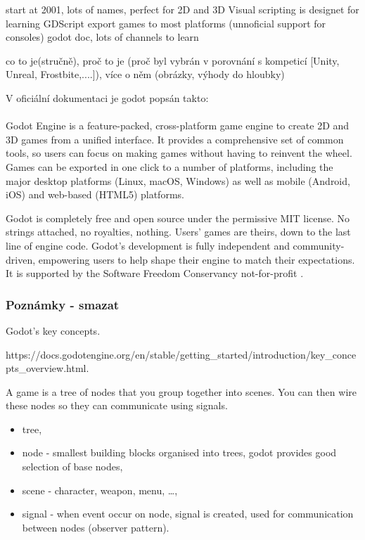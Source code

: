 start at 2001, lots of names, perfect for 2D and 3D
Visual scripting is designet for learning GDScript
export games to most platforms (unnoficial support for consoles)
godot doc, lots of channels to learn


co to je(stručně), proč to je (proč byl vybrán  v porovnání s kompeticí [Unity, Unreal, Frostbite,....]), více o  něm (obrázky, výhody do hloubky)

V oficiální dokumentaci je godot popsán takto:

\paragraph{}
Godot Engine is a feature-packed, cross-platform game engine to create 2D and 3D games from a unified interface. It provides a comprehensive set of common tools, so users can focus on making games without having to reinvent the wheel. Games can be exported in one click to a number of platforms, including the major desktop platforms (Linux, macOS, Windows) as well as mobile (Android, iOS) and web-based (HTML5) platforms.

Godot is completely free and open source under the permissive MIT license. No strings attached, no royalties, nothing. Users' games are theirs, down to the last line of engine code. Godot's development is fully independent and community-driven, empowering users to help shape their engine to match their expectations. It is supported by the Software Freedom Conservancy not-for-profit \cite{godot_introduction} .

\subsubsection{Poznámky - smazat}
Godot's key concepts.

https://docs.godotengine.org/en/stable/getting\_started/introduction/key\_concepts\_overview.html.

A game is a tree of nodes that you group together into scenes. You can then wire these nodes so they can communicate using signals.

\begin{itemize}
	\item tree,
	\item node - smallest building blocks organised into trees, godot provides good selection of base nodes,
	\item scene - character, weapon, menu, \ldots,
	\item  signal - when event occur on node, signal is created, used for communication between nodes (observer pattern).
\end{itemize}


